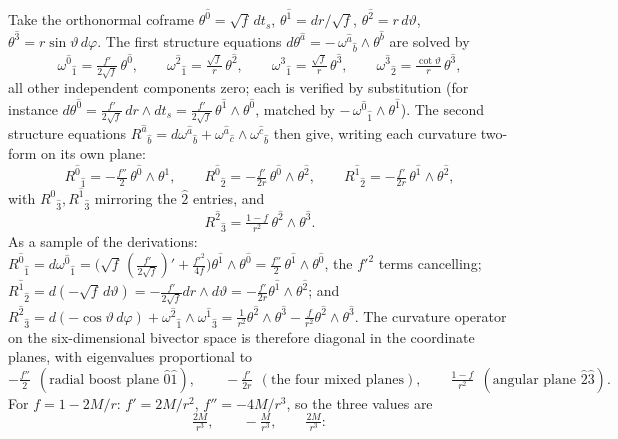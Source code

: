\documentclass[11pt]{article}
\theoremstyle{definition}
\begin{document}
Take the orthonormal coframe $\theta^{\hat 0} = \sqrt f\,dt_s$, $\theta^{\hat 1} = dr/\sqrt f$, $\theta^{\hat 2} = r\,d\vartheta$, $\theta^{\hat 3} = r\sin\vartheta\,d\varphi$. The first structure equations $d\theta^{\hat a} = -\,\omega^{\hat a}{}_{\hat b} \wedge \theta^{\hat b}$ are solved by
\[
\omega^{\hat 0}{}_{\hat 1} = \tfrac{f'}{2\sqrt f}\,\theta^{\hat 0}, \qquad
\omega^{\hat 2}{}_{\hat 1} = \tfrac{\sqrt f}{r}\,\theta^{\hat 2}, \qquad
\omega^{\hat 3}{}_{\hat 1} = \tfrac{\sqrt f}{r}\,\theta^{\hat 3}, \qquad
\omega^{\hat 3}{}_{\hat 2} = \tfrac{\cot\vartheta}{r}\,\theta^{\hat 3},
\]
all other independent components zero; each is verified by substitution (for instance $d\theta^{\hat 0} = \tfrac{f'}{2\sqrt f}\,dr \wedge dt_s = \tfrac{f'}{2\sqrt f}\,\theta^{\hat 1}\wedge\theta^{\hat 0}$, matched by $-\,\omega^{\hat 0}{}_{\hat 1}\wedge\theta^{\hat 1}$). The second structure equations $R^{\hat a}{}_{\hat b} = d\omega^{\hat a}{}_{\hat b} + \omega^{\hat a}{}_{\hat c}\wedge\omega^{\hat c}{}_{\hat b}$ then give, writing each curvature two-form on its own plane:
\[
R^{\hat 0}{}_{\hat 1} = -\tfrac{f''}{2}\,\theta^{\hat 0}\wedge\theta^{\hat 1}, \qquad
R^{\hat 0}{}_{\hat 2} = -\tfrac{f'}{2r}\,\theta^{\hat 0}\wedge\theta^{\hat 2}, \qquad
R^{\hat 1}{}_{\hat 2} = -\tfrac{f'}{2r}\,\theta^{\hat 1}\wedge\theta^{\hat 2},
\]
with $R^{\hat 0}{}_{\hat 3}, R^{\hat 1}{}_{\hat 3}$ mirroring the $\hat 2$ entries, and
\[
R^{\hat 2}{}_{\hat 3} = \tfrac{1 - f}{r^2}\,\theta^{\hat 2}\wedge\theta^{\hat 3} .
\]
As a sample of the derivations: $R^{\hat 0}{}_{\hat 1} = d\omega^{\hat 0}{}_{\hat 1} = \bigl(\sqrt f\,(\tfrac{f'}{2\sqrt f})' + \tfrac{f'^2}{4f}\bigr)\theta^{\hat 1}\wedge\theta^{\hat 0} = \tfrac{f''}{2}\,\theta^{\hat 1}\wedge\theta^{\hat 0}$, the $f'^2$ terms cancelling; $R^{\hat 1}{}_{\hat 2} = d(-\sqrt f\,d\vartheta) = -\tfrac{f'}{2\sqrt f}dr\wedge d\vartheta = -\tfrac{f'}{2r}\theta^{\hat 1}\wedge\theta^{\hat 2}$; and $R^{\hat 2}{}_{\hat 3} = d(-\cos\vartheta\,d\varphi) + \omega^{\hat 2}{}_{\hat 1}\wedge\omega^{\hat 1}{}_{\hat 3} = \tfrac{1}{r^2}\theta^{\hat 2}\wedge\theta^{\hat 3} - \tfrac{f}{r^2}\theta^{\hat 2}\wedge\theta^{\hat 3}$. The curvature operator on the six-dimensional bivector space is therefore diagonal in the coordinate planes, with eigenvalues proportional to
\[
-\tfrac{f''}{2} \ \ (\text{radial boost plane } \hat 0\hat 1), \qquad
-\tfrac{f'}{2r} \ \ (\text{the four mixed planes}), \qquad
\tfrac{1-f}{r^2} \ \ (\text{angular plane } \hat 2\hat 3).
\]
For $f = 1 - 2M/r$: $f' = 2M/r^2$, $f'' = -4M/r^3$, so the three values are
\[
\tfrac{2M}{r^3}, \qquad -\tfrac{M}{r^3}, \qquad \tfrac{2M}{r^3} :
\]
\end{document}
